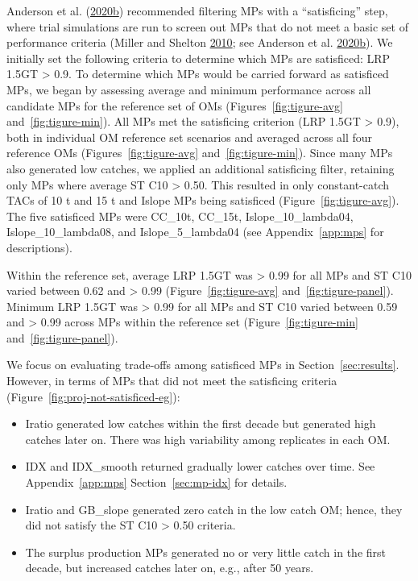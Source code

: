 \documentclass[11pt]{book}
\begin{document}
Anderson et al. (\protect\hyperlink{ref-anderson2020gfmp}{2020}\protect\hyperlink{ref-anderson2020gfmp}{b}) recommended filtering MPs with a ``satisficing'' step, where trial simulations are run to screen out MPs that do not meet a basic set of performance criteria (Miller and Shelton \protect\hyperlink{ref-miller2010}{2010}; see Anderson et al. \protect\hyperlink{ref-anderson2020gfmp}{2020}\protect\hyperlink{ref-anderson2020gfmp}{b}). We initially set the following criteria to determine which MPs are satisficed: LRP 1.5GT \textgreater{} 0.9. To determine which MPs would be carried forward as satisficed MPs, we began by assessing average and minimum performance across all candidate MPs for the reference set of OMs (Figures~\ref{fig:tigure-avg} and~\ref{fig:tigure-min}). All MPs met the satisficing criterion (LRP 1.5GT \textgreater{} 0.9), both in individual OM reference set scenarios and averaged across all four reference OMs (Figures~\ref{fig:tigure-avg} and~\ref{fig:tigure-min}). Since many MPs also generated low catches, we applied an additional satisficing filter, retaining only MPs where average ST C10 \textgreater{} 0.50. This resulted in only constant-catch TACs of 10 t and 15 t and Islope MPs being satisficed (Figure~\ref{fig:tigure-avg}). The five satisficed MPs were CC\_10t, CC\_15t, Islope\_10\_lambda04, Islope\_10\_lambda08, and Islope\_5\_lambda04 (see Appendix~\ref{app:mps} for descriptions).

Within the reference set, average LRP 1.5GT was \textgreater{} 0.99 for all MPs and ST C10 varied between 0.62 and \textgreater{} 0.99 (Figure~\ref{fig:tigure-avg} and~\ref{fig:tigure-panel}). Minimum LRP 1.5GT was \textgreater{} 0.99 for all MPs and ST C10 varied between 0.59 and \textgreater{} 0.99 across MPs within the reference set (Figure~\ref{fig:tigure-min} and~\ref{fig:tigure-panel}).

We focus on evaluating trade-offs among satisficed MPs in Section~\ref{sec:results}. However, in terms of MPs that did not meet the satisficing criteria (Figure~\ref{fig:proj-not-satisficed-eg}):
\begin{itemize}

\item
  Iratio generated low catches within the first decade but generated high catches later on. There was high variability among replicates in each OM.
\item
  IDX and IDX\_smooth returned gradually lower catches over time. See Appendix~\ref{app:mps} Section~\ref{sec:mp-idx} for details.
\item
  Iratio and GB\_slope generated zero catch in the low catch OM; hence, they did not satisfy the ST C10 \textgreater{} 0.50 criteria.
\item
  The surplus production MPs generated no or very little catch in the first decade, but increased catches later on, e.g., after 50 years.
\end{itemize}
\end{document}
